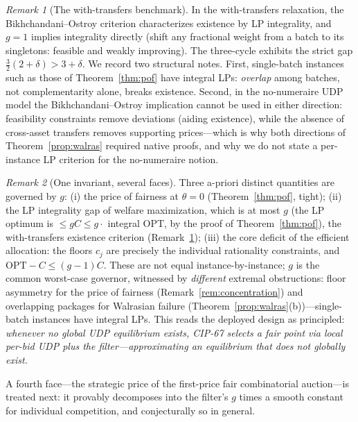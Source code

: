 \documentclass[11pt]{article}
\theoremstyle{remark}
\newtheorem{remark}{Remark}
\newcommand{\OPT}{\mathrm{OPT}}
\begin{document}
\begin{remark}[The with-transfers benchmark]\label{rem:botransfers}
In the with-transfers relaxation, the Bikhchandani--Ostroy criterion
\cite{bikhchandani2002} characterizes existence by LP integrality, and
$g=1$ implies integrality directly (shift any fractional weight from a
batch to its singletons: feasible and weakly improving). The three-cycle
exhibits the strict gap
$\tfrac32(2+\delta)>3+\delta$. We record two structural notes. First,
single-batch instances such as those of Theorem~\ref{thm:pof} have
integral LPs: \emph{overlap} among batches, not complementarity alone,
breaks existence. Second, in the no-numeraire UDP model the Bikhchandani--Ostroy
implication cannot be used in either direction: feasibility constraints
remove deviations (aiding existence), while the absence of cross-asset
transfers removes supporting prices---which is why both directions of
Theorem~\ref{prop:walras} required native proofs, and why we do not state
a per-instance LP criterion for the no-numeraire notion.
\end{remark}

\begin{remark}[One invariant, several faces]\label{rem:faces}
Three a-priori distinct quantities are governed by $g$: (i) the price of
fairness at $\theta=0$ (Theorem~\ref{thm:pof}, tight); (ii) the LP
integrality gap of welfare maximization, which is at most $g$ (the LP
optimum is $\le gC\le g\cdot$ integral OPT, by the proof of
Theorem~\ref{thm:pof}), the with-transfers existence criterion
(Remark~\ref{rem:botransfers}); (iii) the core deficit of the
efficient allocation: the floors $c_j$ are precisely the individual
rationality constraints, and $\OPT-C\le(g-1)C$. These are not equal
instance-by-instance; $g$ is the common worst-case governor, witnessed by
\emph{different} extremal obstructions: floor asymmetry for the price of
fairness (Remark~\ref{rem:concentration}) and overlapping packages for
Walrasian failure (Theorem~\ref{prop:walras}(b))---single-batch
instances have integral LPs. This reads the deployed design
as principled: \emph{whenever no global UDP equilibrium exists, CIP-67
selects a fair point via local per-bid UDP plus the filter---approximating
an equilibrium that does not globally exist.}

A fourth face---the strategic price of the first-price fair combinatorial
auction---is treated next: it provably decomposes into the filter's $g$
times a smooth constant for individual competition, and conjecturally so
in general.
\end{remark}
\end{document}
